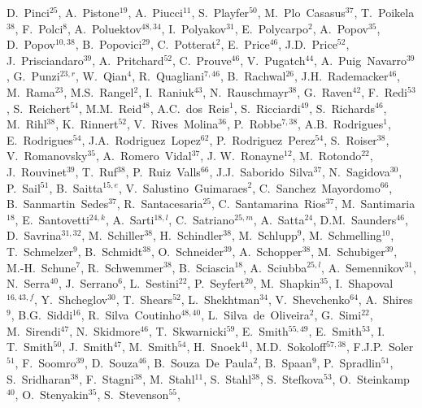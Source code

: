 \documentclass[12pt,a4paper]{article}
\begin{document}
\begin{flushleft}
D.~Pinci$^{25}$, 
A.~Pistone$^{19}$, 
A.~Piucci$^{11}$, 
S.~Playfer$^{50}$, 
M.~Plo~Casasus$^{37}$, 
T.~Poikela$^{38}$, 
F.~Polci$^{8}$, 
A.~Poluektov$^{48,34}$, 
I.~Polyakov$^{31}$, 
E.~Polycarpo$^{2}$, 
A.~Popov$^{35}$, 
D.~Popov$^{10,38}$, 
B.~Popovici$^{29}$, 
C.~Potterat$^{2}$, 
E.~Price$^{46}$, 
J.D.~Price$^{52}$, 
J.~Prisciandaro$^{39}$, 
A.~Pritchard$^{52}$, 
C.~Prouve$^{46}$, 
V.~Pugatch$^{44}$, 
A.~Puig~Navarro$^{39}$, 
G.~Punzi$^{23,r}$, 
W.~Qian$^{4}$, 
R.~Quagliani$^{7,46}$, 
B.~Rachwal$^{26}$, 
J.H.~Rademacker$^{46}$, 
M.~Rama$^{23}$, 
M.S.~Rangel$^{2}$, 
I.~Raniuk$^{43}$, 
N.~Rauschmayr$^{38}$, 
G.~Raven$^{42}$, 
F.~Redi$^{53}$, 
S.~Reichert$^{54}$, 
M.M.~Reid$^{48}$, 
A.C.~dos~Reis$^{1}$, 
S.~Ricciardi$^{49}$, 
S.~Richards$^{46}$, 
M.~Rihl$^{38}$, 
K.~Rinnert$^{52}$, 
V.~Rives~Molina$^{36}$, 
P.~Robbe$^{7,38}$, 
A.B.~Rodrigues$^{1}$, 
E.~Rodrigues$^{54}$, 
J.A.~Rodriguez~Lopez$^{62}$, 
P.~Rodriguez~Perez$^{54}$, 
S.~Roiser$^{38}$, 
V.~Romanovsky$^{35}$, 
A.~Romero~Vidal$^{37}$, 
J. W.~Ronayne$^{12}$, 
M.~Rotondo$^{22}$, 
J.~Rouvinet$^{39}$, 
T.~Ruf$^{38}$, 
P.~Ruiz~Valls$^{66}$, 
J.J.~Saborido~Silva$^{37}$, 
N.~Sagidova$^{30}$, 
P.~Sail$^{51}$, 
B.~Saitta$^{15,e}$, 
V.~Salustino~Guimaraes$^{2}$, 
C.~Sanchez~Mayordomo$^{66}$, 
B.~Sanmartin~Sedes$^{37}$, 
R.~Santacesaria$^{25}$, 
C.~Santamarina~Rios$^{37}$, 
M.~Santimaria$^{18}$, 
E.~Santovetti$^{24,k}$, 
A.~Sarti$^{18,l}$, 
C.~Satriano$^{25,m}$, 
A.~Satta$^{24}$, 
D.M.~Saunders$^{46}$, 
D.~Savrina$^{31,32}$, 
M.~Schiller$^{38}$, 
H.~Schindler$^{38}$, 
M.~Schlupp$^{9}$, 
M.~Schmelling$^{10}$, 
T.~Schmelzer$^{9}$, 
B.~Schmidt$^{38}$, 
O.~Schneider$^{39}$, 
A.~Schopper$^{38}$, 
M.~Schubiger$^{39}$, 
M.-H.~Schune$^{7}$, 
R.~Schwemmer$^{38}$, 
B.~Sciascia$^{18}$, 
A.~Sciubba$^{25,l}$, 
A.~Semennikov$^{31}$, 
N.~Serra$^{40}$, 
J.~Serrano$^{6}$, 
L.~Sestini$^{22}$, 
P.~Seyfert$^{20}$, 
M.~Shapkin$^{35}$, 
I.~Shapoval$^{16,43,f}$, 
Y.~Shcheglov$^{30}$, 
T.~Shears$^{52}$, 
L.~Shekhtman$^{34}$, 
V.~Shevchenko$^{64}$, 
A.~Shires$^{9}$, 
B.G.~Siddi$^{16}$, 
R.~Silva~Coutinho$^{48,40}$, 
L.~Silva~de~Oliveira$^{2}$, 
G.~Simi$^{22}$, 
M.~Sirendi$^{47}$, 
N.~Skidmore$^{46}$, 
T.~Skwarnicki$^{59}$, 
E.~Smith$^{55,49}$, 
E.~Smith$^{53}$, 
I. T.~Smith$^{50}$, 
J.~Smith$^{47}$, 
M.~Smith$^{54}$, 
H.~Snoek$^{41}$, 
M.D.~Sokoloff$^{57,38}$, 
F.J.P.~Soler$^{51}$, 
F.~Soomro$^{39}$, 
D.~Souza$^{46}$, 
B.~Souza~De~Paula$^{2}$, 
B.~Spaan$^{9}$, 
P.~Spradlin$^{51}$, 
S.~Sridharan$^{38}$, 
F.~Stagni$^{38}$, 
M.~Stahl$^{11}$, 
S.~Stahl$^{38}$, 
S.~Stefkova$^{53}$, 
O.~Steinkamp$^{40}$, 
O.~Stenyakin$^{35}$, 
S.~Stevenson$^{55}$, 

\end{flushleft}
\end{document}
